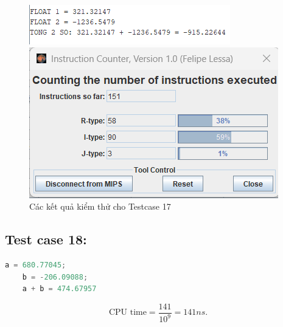 \begin{figure}[!h]
    \centering
    \begin{minipage}[b]{0.48\textwidth}
        \centering
        \includegraphics[width=\textwidth]{image/TESTCASE/Testcase 17.png}
    \end{minipage}
    \hfill
    \begin{minipage}[b]{0.48\textwidth}
        \centering
        \includegraphics[width=\textwidth]{image/TESTCASE/Instruction Counter 17.png}
    \end{minipage}
    \vspace{0.5cm}
    \caption{Các kết quả kiểm thử cho Testcase 17}
\end{figure}

\subsection{Test case 18:}
\begin{lstlisting}[language=Python]
    a = 680.77045;
    b = -206.09088;
    a + b = 474.67957
\end{lstlisting}
\[
\text{CPU time} = \frac{\text{141}}{10^9} = 141 ns.
\]


